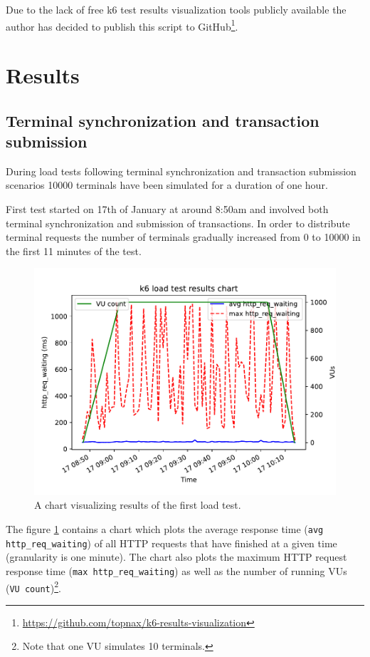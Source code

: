\documentclass[12pt, a4paper]{article}
\let\oldsection\section
\renewcommand\section{\clearpage\oldsection}
\begin{document}
Due to the lack of free k6 test results visualization tools publicly available the author has decided to publish this script to GitHub\footnote{\url{https://github.com/topnax/k6-results-visualization}}.

\section{Results}

\subsection{Terminal synchronization and transaction submission}
During load tests following terminal synchronization and transaction submission scenarios 10000 terminals have been simulated for a duration of one hour.

First test started on 17th of January at around 8:50am and involved both terminal synchronization and submission of transactions.
In order to distribute terminal requests the number of terminals gradually increased from 0 to 10000 in the first 11 minutes of the test.

\begin{figure}[!ht]
    \centering 
    \includegraphics[width=1\textwidth]{pdf/avg-waiting-time-1.pdf}
    \caption{A chart visualizing results of the first load test.}
    \label{fig:waiting-time-1}
\end{figure}

The figure \ref{fig:waiting-time-1} contains a chart which plots the average response time (\texttt{avg http\_req\_waiting}) of all HTTP requests that have finished at a given time (granularity is one minute).
The chart also plots the maximum HTTP request response time (\texttt{max http\_req\_waiting}) as well as the number of running VUs (\texttt{VU count})\footnote{Note that one VU simulates 10 terminals.}.
\end{document}
